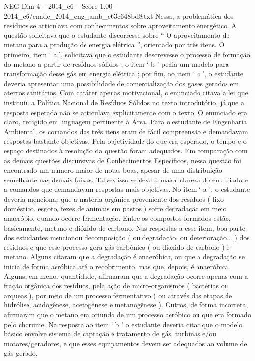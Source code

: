 \begin{textsample}{NEG Dim 4 – 2014\_c6 – Score 1.00 – 2014\_c6/enade\_2014\_eng\_amb\_c63c648bd8.txt}
Nessa, a problemática dos resíduos se articulava com conhecimentos sobre aproveitamento energético.
A questão solicitava que o estudante discorresse sobre “ O aproveitamento do metano para a produção de energia elétrica ”, orientado por três itens.
O primeiro, item ‘ a ’, solicitava que o estudante descrevesse o processo de formação do metano a partir de resíduos sólidos ; o item ‘ b ’ pedia um modelo para transformação desse gás em energia elétrica ; por fim, no item ‘ c ’, o estudante deveria apresentar uma possibilidade de comercialização dos gases gerados em aterros sanitários.
Com caráter apenas motivacional, o enunciado citava a lei que instituiu a Política Nacional de Resíduos Sólidos no texto introdutório, já que a resposta esperada não se articulava explicitamente com o texto.
O enunciado era claro, redigido em linguagem pertinente à Área.
Para o estudante de Engenharia Ambiental, os comandos dos três itens eram de fácil compreensão e demandavam respostas bastante objetivas.
Pela objetividade do que era esperado, o tempo e o espaço destinados à resolução da questão foram adequados.
Em comparação com as demais questões discursivas de Conhecimentos Específicos, nessa questão foi encontrado um número maior de notas boas, apesar de uma distribuição semelhante nas demais faixas.
Talvez isso se deva à maior clareza do enunciado e a comandos que demandavam respostas mais objetivas.
No item ‘ a ’, o estudante deveria mencionar que a matéria orgânica proveniente dos resíduos ( lixo doméstico, esgoto, fezes de animais em pastos ) sofre degradação em meio anaeróbio, quando ocorre fermentação.
Entre os compostos formados estão, basicamente, metano e dióxido de carbono.
Nas respostas a esse item, boa parte dos estudantes mencionou decomposição ( ou degradação, ou deterioração... ) dos resíduos e que esse processo gera gás carbônico ( ou dióxido de carbono ) e metano.
Alguns citaram que a degradação é anaeróbica, ou que a degradação se inicia de forma aeróbica até o recobrimento, mas que, depois, é anaeróbica.
Alguns, em menor quantidade, afirmaram que a degradação ocorre apenas com a fração orgânica dos resíduos, pela ação de micro-organismos ( bactérias ou arqueas ), por meio de um processo fermentativo ( ou através das etapas de hidrólise, acidogênese, acetogênese e metanogênese ).
Outros, de forma incorreta, afirmaram que o metano era oriundo de um processo aeróbico ou que era formado pelo chorume.
Na resposta ao item ‘ b ’ o estudante deveria citar que o modelo básico envolve sistema de captação e tratamento de gás, turbinas e/ou motores/geradores, e que esses equipamentos devem ser adequados ao volume de gás gerado.

\end{textsample}
